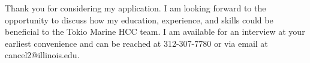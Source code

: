 
Thank you for considering my application. I am looking forward to the opportunity to discuss how my education, experience, and skills could be beneficial to the Tokio Marine HCC team. I am available for an interview at your earliest convenience and can be reached at 312-307-7780 or via email at cancel2@illinois.edu.
